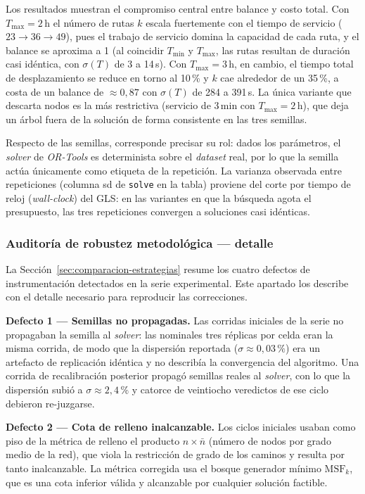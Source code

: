 Los resultados muestran el compromiso central entre balance y costo total. Con
$T_{\max}=2$\,h el número de rutas $k$ escala fuertemente con el tiempo de servicio
($23 \rightarrow 36 \rightarrow 49$), pues el trabajo de servicio domina la capacidad de
cada ruta, y el balance se aproxima a 1 (al coincidir $T_{\min}$ y $T_{\max}$, las rutas
resultan de duración casi idéntica, con $\sigma(T)$ de 3 a 14\,s). Con $T_{\max}=3$\,h,
en cambio, el tiempo total de desplazamiento se reduce en torno al 10\,\% y $k$ cae
alrededor de un 35\,\%, a costa de un balance de $\approx 0{,}87$ con $\sigma(T)$ de 284
a 391\,s. La única variante que descarta nodos es la más restrictiva (servicio de 3\,min
con $T_{\max}=2$\,h), que deja un árbol fuera de la solución de forma consistente en las
tres semillas.

Respecto de las semillas, corresponde precisar su rol: dados los parámetros, el
\textit{solver} de \textit{OR-Tools} es determinista sobre el \textit{dataset} real, por
lo que la semilla actúa únicamente como etiqueta de la repetición. La varianza observada
entre repeticiones (columna sd de \texttt{solve} en la tabla) proviene del corte por tiempo
de reloj (\textit{wall-clock}) del GLS: en las variantes en que la búsqueda agota el
presupuesto, las tres repeticiones convergen a soluciones casi idénticas.

\subsubsection*{Auditoría de robustez metodológica --- detalle}
\label{anx:auditoria-robustez}

La Sección~\ref{sec:comparacion-estrategias} resume los cuatro defectos de
instrumentación detectados en la serie experimental. Este apartado los describe
con el detalle necesario para reproducir las correcciones.

\textbf{Defecto 1 --- Semillas no propagadas.}
Las corridas iniciales de la serie no propagaban la semilla al \textit{solver}: las
nominales tres réplicas por celda eran la misma corrida, de modo que la dispersión
reportada ($\sigma \approx 0{,}03\,\%$) era un artefacto de replicación idéntica y no
describía la convergencia del algoritmo. Una corrida de recalibración posterior propagó
semillas reales al \textit{solver}, con lo que la dispersión subió a $\sigma \approx
2{,}4\,\%$ y catorce de veintiocho veredictos de ese ciclo debieron re-juzgarse.

\textbf{Defecto 2 --- Cota de relleno inalcanzable.}
Los ciclos iniciales usaban como piso de la métrica de relleno el producto
$n \times \bar{n}$ (número de nodos por grado medio de la red), que viola la restricción
de grado de los caminos y resulta por tanto inalcanzable. La métrica corregida usa el
bosque generador mínimo $\text{MSF}_k$, que es una cota inferior válida y alcanzable por
cualquier solución factible.

